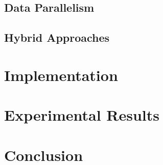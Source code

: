 \documentclass[conference,compsoc,a4paper]{IEEEtran}
\begin{document}

\subsection{Data Parallelism} %
\label{sub:data_parallelism}


\subsection{Hybrid Approaches} %
\label{sub:hybrid_approaches}





\section{Implementation} %
\label{sec:implementation}


\section{Experimental Results} %
\label{sec:experimental_results}


\section{Conclusion} %
\label{sec:conclusion}



\end{document}
